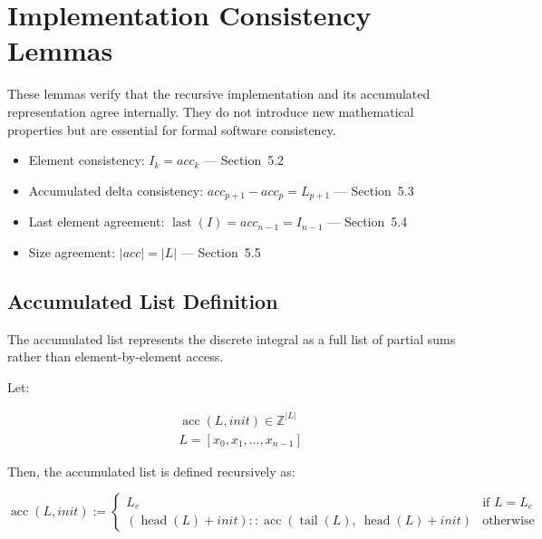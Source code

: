 \section{Implementation Consistency Lemmas}
\label{sec:consistency-lemmas}

These lemmas verify that the recursive implementation and its accumulated
representation agree internally. They do not introduce new mathematical
properties but are essential for formal software consistency.

\begin{itemize}
  \item Element consistency: $I_k = acc_k$ --- Section~5.2
  \item Accumulated delta consistency: $acc_{p+1} - acc_p = L_{p+1}$
    --- Section~5.3
  \item Last element agreement: $\operatorname{last}(I) = acc_{n-1} =
    I_{n-1}$ --- Section~5.4
  \item Size agreement: $\lvert acc\rvert = \lvert L\rvert$ ---
    Section~5.5
\end{itemize}

\subsection{Accumulated List Definition}
\label{sec:accumulated-list-definition}

The accumulated list represents the discrete integral as a full list of
partial sums rather than element-by-element access.

Let:

\begin{equation*}
\begin{aligned}
& \operatorname{acc}(L, init) \in \mathbb{Z}^{\lvert L\rvert} \\
& L = [x_0, x_1, \dots, x_{n-1}]
\end{aligned}
\end{equation*}

Then, the accumulated list is defined recursively as:

\begin{equation*}
\operatorname{acc}(L, init) :=
\begin{cases}
L_e & \text{if } L = L_e \\
(\operatorname{head}(L) + init) :: \operatorname{acc}(\operatorname{tail}(L),\ \operatorname{head}(L) + init) & \text{otherwise}
\end{cases}
\end{equation*}

